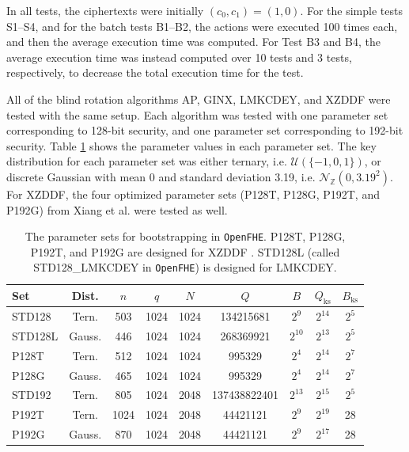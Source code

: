 In all tests, the ciphertexts were initially $(c_0, c_1)=(1,0)$. For the simple tests \linebreak S1--S4, and for the batch tests B1--B2, the actions were executed 100 times each, and then the average execution time was computed. For Test B3 and B4, the average execution time was instead computed over 10 tests and 3 tests, respectively, to decrease the total execution time for the test.

All of the blind rotation algorithms AP, GINX, LMKCDEY, and XZDDF were tested with the same setup. Each algorithm was tested with one parameter set corresponding to 128-bit security, and one parameter set corresponding to 192-bit security. Table \ref{tab:paramsets} shows the parameter values in each parameter set. The key distribution for each parameter set was either ternary, i.e. $\mathcal{U}(\{-1,0,1\})$, or discrete Gaussian with mean 0 and standard deviation 3.19, i.e. $\mathcal{N}_{\mathbb{Z}}(0, 3.19^2)$. For XZDDF, the four optimized parameter sets (P128T, P128G, P192T, and P192G) from Xiang et al. \cite{cite:fast_bootstrap_crypto23} were tested as well.


\begin{table}[ht]
\centering
\caption{The parameter sets for bootstrapping in \texttt{OpenFHE}. P128T, P128G, P192T, and P192G are designed for XZDDF \cite{cite:fast_bootstrap_crypto23}. STD128L (called STD128\_LMKCDEY in \texttt{OpenFHE}) is designed for LMKCDEY.}
\begin{tabular}{l|cccccccc}
\toprule
\textbf{Set} & \textbf{Dist.} & $n$ & $q$ & $N$ & $Q$ & $B$ & $Q_{\text{ks}}$ & $B_{\text{ks}}$ \\
\midrule
STD128 & Tern. & 503 & 1024 & 1024 & 134215681 & $2^{9}$ & $2^{14}$ & $2^5$ \\
STD128L & Gauss. & 446 & 1024 & 1024 & 268369921 & $2^{10}$ & $2^{13}$ & $2^{5}$ \\
P128T & Tern. & 512 & 1024 & 1024 & 995329 & $2^{4}$ & $2^{14}$ & $2^7$ \\
P128G & Gauss. & 465 & 1024 & 1024 & 995329 & $2^{4}$ & $2^{14}$ & $2^7$ \\
STD192 & Tern. & 805 & 1024 & 2048 & 137438822401 & $2^{13}$ & $2^{15}$ & $2^5$ \\
P192T & Tern. & 1024 & 1024 & 2048 & 44421121 & $2^{9}$ & $2^{19}$ & 28 \\
P192G & Gauss. & 870 & 1024 & 2048 & 44421121 & $2^{9}$ & $2^{17}$ & 28 \\
\bottomrule
\end{tabular}
\label{tab:paramsets}
\end{table}

